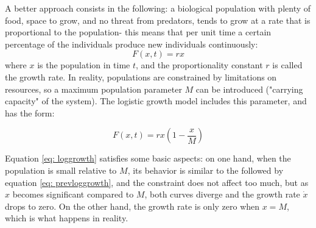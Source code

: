 A better approach consists in the following: a biological population with plenty of food, space to grow, and no threat from predators, tends to grow at a rate that is proportional to the population- this means that per unit time a certain percentage of the individuals produce new individuals continuously:
\begin{equation}\label{eq: prevloggrowth}
F(x,t)=rx
\end{equation}
where $x$ is the population in time $t$, and the proportionality constant $r$ is called the growth rate. In reality, populations are constrained by limitations on resources, so a maximum population parameter $M$ can be introduced ("carrying capacity" of the system). The logistic growth model includes this parameter, and has the form:

\begin{equation}\label{eq: loggrowth}
F(x,t)=rx\left(1-\frac{x}{M}\right)
\end{equation}

Equation \ref{eq: loggrowth} satisfies some basic aspects: on one hand, when the population is small relative to $M$, its behavior is similar to the followed by equation \ref{eq: prevloggrowth}, and the constraint does not affect too much, but as $x$ becomes significant compared to $M$, both curves diverge and the growth rate $\dot{x}$ drops to zero. On the other hand, the growth rate is only zero when $x=M$, which is what happens in reality.